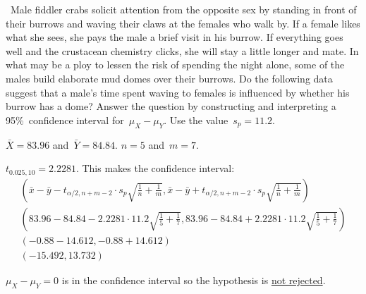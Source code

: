 \begin{problem}
  ~Male fiddler crabs solicit attention from the opposite sex by standing in front of their burrows and waving their claws at the females who walk by. If a female likes what she sees, she pays the male a brief visit in his burrow. If everything goes well and the crustacean chemistry clicks, she will stay a little longer and mate. In what may be a ploy to lessen the risk of spending the night alone, some of the males build elaborate mud domes over their burrows. Do the following data suggest that a male's time spent waving to females is influenced by whether his burrow has a dome? Answer the question by constructing and interpreting a 95\%~confidence interval for~${\mu_{X} - \mu_{Y}}$. Use the value~${s_p = 11.2}$.
\end{problem}

\noindent
${\bar{X} = 83.96}$ and~${\bar{Y} = 84.84}$. ${n = 5}$ and~${m = 7}$.

\noindent
${t_{0.025,10} = 2.2281}$.  This makes the confidence interval:
\begin{align}
  \left(\bar{x} - \bar{y} - t_{\alpha/2,n+m-2} \cdot s_p\sqrt{\frac{1}{n} + \frac{1}{m}},\bar{x} - \bar{y} + t_{\alpha/2,n+m-2} \cdot s_p\sqrt{\frac{1}{n} + \frac{1}{m}}\right) \\
  \left(83.96 - 84.84 - 2.2281 \cdot 11.2 \sqrt{\frac{1}{5} + \frac{1}{7}}, 83.96 - 84.84 + 2.2281 \cdot 11.2 \sqrt{\frac{1}{5} + \frac{1}{7}}\right) \\
  \left(-0.88 - 14.612, -0.88 + 14.612\right) \\
  \left(-15.492, 13.732\right)
\end{align}

\noindent
${\mu_{X} - \mu_{Y} = 0}$ is in the confidence interval so the hypothesis is \underline{not rejected}.
